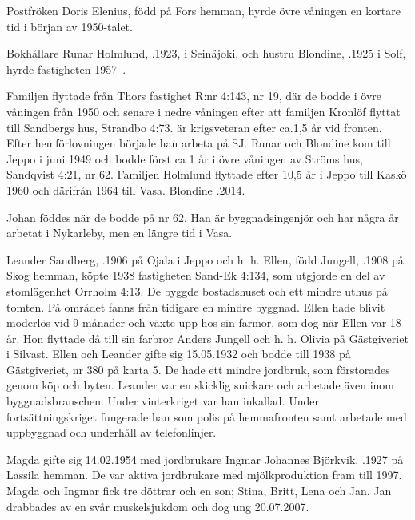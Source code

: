 Postfröken Doris Elenius, född på Fors hemman, hyrde övre våningen en kortare tid i början av 1950-talet.

Bokhållare Runar Holmlund, .1923, i Seinäjoki, och hustru Blondine, .1925 i Solf, hyrde fastigheten 1957--.
\begin{jhchildren}
  \item {}
  \item {}
\end{jhchildren}
Familjen flyttade från Thors fastighet R:nr 4:143, nr 19, där de bodde i övre våningen från 1950 och senare i nedre våningen efter att familjen Kronlöf flyttat till Sandbergs hus, Strandbo 4:73.  är krigsveteran efter ca.1,5 år vid fronten. Efter hemförlovningen började han arbeta på SJ. Runar och Blondine kom till Jeppo i juni 1949 och bodde först ca 1 år i övre våningen av Ströms hus, Sandqvist 4:21, nr 62. Familjen Holmlund flyttade efter 10,5 år i Jeppo till Kaskö 1960 och därifrån 1964 till Vasa. Blondine .2014.

Johan föddes när de bodde på nr 62. Han är byggnadsingenjör och har några år arbetat i Nykarleby, men en längre tid i Vasa.


%
Leander Sandberg, .1906 på Ojala i Jeppo och h. h. Ellen, född Jungell, .1908 på Skog hemman, köpte 1938 fastigheten Sand-Ek 4:134, som utgjorde en del av stomlägenhet Orrholm 4:13. De byggde bostadshuset och ett mindre uthus på tomten. På området fanns från tidigare en mindre byggnad. Ellen hade blivit moderlös vid 9 månader och växte upp hos sin farmor, som dog när Ellen var 18 år. Hon flyttade då till sin farbror Anders Jungell och h. h. Olivia på Gästgiveriet i Silvast. Ellen och Leander gifte sig 15.05.1932 och bodde till 1938 på Gästgiveriet, nr 380 på karta 5. De hade ett mindre jordbruk, som förstorades genom köp och byten. Leander var en skicklig snickare och arbetade även inom byggnadsbranschen. Under vinterkriget var han inkallad. Under fortsättningskriget fungerade han som polis på hemmafronten samt arbetade med uppbyggnad och underhåll av telefonlinjer.
\begin{jhchildren}
  \item {}
  \item {}
\end{jhchildren}
Magda gifte sig 14.02.1954 med jordbrukare Ingmar Johannes Björkvik, .1927 på Lassila hemman. De var aktiva jordbrukare med mjölkproduktion fram till 1997. Magda och Ingmar fick tre döttrar och en son; Stina, Britt, Lena och Jan. Jan drabbades av en svår muskelsjukdom och dog ung 20.07.2007.

